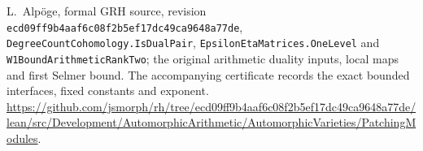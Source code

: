 L.~Alp\"oge, formal GRH source, revision
\texttt{ecd09ff9b4aaf6c08f2b5ef17dc49ca9648a77de},
\texttt{DegreeCountCohomology.IsDualPair},
\texttt{EpsilonEtaMatrices.OneLevel} and
\texttt{W1BoundArithmeticRankTwo}; the original arithmetic duality
inputs, local maps and first Selmer bound. The accompanying certificate
records the exact bounded interfaces, fixed constants and exponent.
\url{https://github.com/jsmorph/rh/tree/ecd09ff9b4aaf6c08f2b5ef17dc49ca9648a77de/lean/src/Development/AutomorphicArithmetic/AutomorphicVarieties/PatchingModules}.
